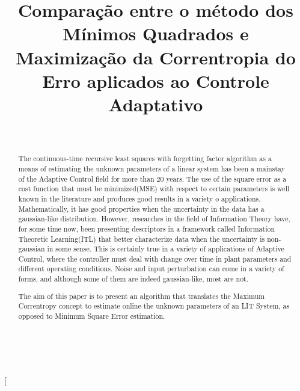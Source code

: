 \documentclass[conference,harvard,brazil,english]{sbatex}
\begin{document}

\title{Comparação entre o método dos Mínimos Quadrados e Maximização da Correntropia do Erro aplicados ao Controle Adaptativo}

%
%

\author{~}{~}
\address{~~\\ ~~\\ ~~}

\twocolumn[

\maketitle

\begin{abstract}
  The continuous-time recursive least squares with forgetting factor algorithm as a means of estimating the unknown parameters of a linear system has been a mainstay of the Adaptive Control field for more than 20 years. The use of the square error as a cost function that must be minimized(MSE) with respect to certain parameters is well known in the literature and produces good results in a variety o applications. Mathematically, it has good properties when the uncertainty in the data has a gaussian-like distribution. However, researches in the field of Information Theory have, for some time now, been presenting descriptors in a framework called Information Theoretic Learning(ITL) that better characterize data when the uncertainty is non-gaussian in some sense. This is certainly true in a variety of applications of Adaptive Control, where the controller must deal with change over time in plant parameters and different operating conditions. Noise and input perturbation can come in a variety of forms, and although some of them are indeed gaussian-like, most are not.  
  
  The aim of this paper is to present an algorithm that translates the Maximum Correntropy concept to estimate online the unknown parameters of an LIT System, as opposed to Minimum Square Error estimation.   
      
\end{abstract}

\end{document}
